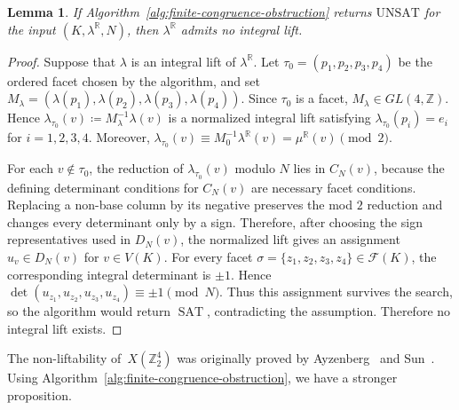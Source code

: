 \documentclass{amsart}
\newcommand{\Z}{\mathbb{Z}}
\newcommand{\R}{\mathbb{R}}
\newcommand{\cF}{\mathcal{F}}
\DeclareMathOperator{\SAT}{SAT}
\newtheorem{lemma}[theorem]{Lemma}
\theoremstyle{definition}
\theoremstyle{remark}
\begin{document}
\begin{lemma}\label{lem:finite-congruence-obstruction}
    If Algorithm~\ref{alg:finite-congruence-obstruction} returns $\mathrm{UNSAT}$ for the input $(K,\lambda^\R,N)$, then $\lambda^\R$ admits no integral lift.
\end{lemma}
\begin{proof}
    Suppose that $\lambda$ is an integral lift of $\lambda^\R$. 
    Let $\tau_0=(p_1,p_2,p_3,p_4)$ be the ordered facet chosen by the algorithm, and set $M_\lambda=(\lambda(p_1),\lambda(p_2),\lambda(p_3),\lambda(p_4))$.
    Since $\tau_0$ is a facet, $M_\lambda\in GL(4,\Z)$. 
    Hence $\lambda_{\tau_0}(v)\coloneq M_\lambda^{-1}\lambda(v)$ is a normalized integral lift satisfying $\lambda_{\tau_0}(p_i)=e_i$ for $i=1,2,3,4$.
    Moreover, $\lambda_{\tau_0}(v)\equiv M_0^{-1}\lambda^\R(v)=\mu^\R(v)\pmod2$.
    
    For each $v\notin\tau_0$, the reduction of $\lambda_{\tau_0}(v)$ modulo $N$ lies in $C_N(v)$, because the defining determinant conditions for $C_N(v)$ are necessary facet conditions. 
    Replacing a non-base column by its negative preserves the mod $2$ reduction and changes every determinant only by a sign. 
    Therefore, after choosing the sign representatives used in $D_N(v)$, the normalized lift gives an assignment $u_v\in D_N(v)$ for $v\in V(K)$.
    For every facet $\sigma=\{z_1,z_2,z_3,z_4\}\in \cF(K)$, the corresponding integral determinant is $\pm1$. 
    Hence $\det(u_{z_1},u_{z_2},u_{z_3},u_{z_4})\equiv\pm1\pmod N$.
    Thus this assignment survives the search, so the algorithm would return $\SAT$, contradicting the assumption.
    Therefore no integral lift exists.
\end{proof}

The non-liftability of~$X(\Z_2^4)$ was originally proved by Ayzenberg~\cite{Ayzenberg2016} and Sun~\cite{Sun2017}.
Using Algorithm~\ref{alg:finite-congruence-obstruction}, we have a stronger proposition.
\end{document}
